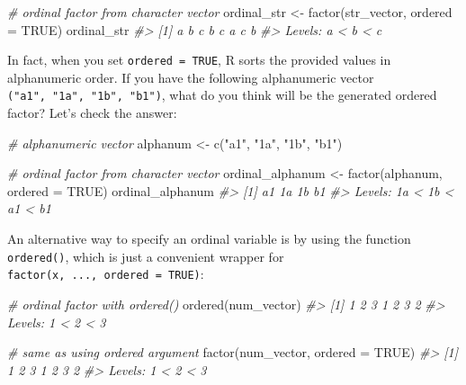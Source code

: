 \documentclass[
]{book}
\newenvironment{Shaded}{\begin{snugshade}}{\end{snugshade}}
\newcommand{\AttributeTok}[1]{\textcolor[rgb]{0.77,0.63,0.00}{#1}}
\newcommand{\CommentTok}[1]{\textcolor[rgb]{0.56,0.35,0.01}{\textit{#1}}}
\newcommand{\ConstantTok}[1]{\textcolor[rgb]{0.00,0.00,0.00}{#1}}
\newcommand{\FunctionTok}[1]{\textcolor[rgb]{0.00,0.00,0.00}{#1}}
\newcommand{\NormalTok}[1]{#1}
\newcommand{\OtherTok}[1]{\textcolor[rgb]{0.56,0.35,0.01}{#1}}
\newcommand{\StringTok}[1]{\textcolor[rgb]{0.31,0.60,0.02}{#1}}
\begin{document}
\begin{Shaded}
\begin{Highlighting}[]
\CommentTok{\# ordinal factor from character vector}
\NormalTok{ordinal\_str }\OtherTok{\textless{}{-}} \FunctionTok{factor}\NormalTok{(str\_vector, }\AttributeTok{ordered =} \ConstantTok{TRUE}\NormalTok{)}
\NormalTok{ordinal\_str}
\CommentTok{\#\textgreater{} [1] a b c b c a c b}
\CommentTok{\#\textgreater{} Levels: a \textless{} b \textless{} c}
\end{Highlighting}
\end{Shaded}

In fact, when you set \texttt{ordered\ =\ TRUE}, R sorts the provided values in
alphanumeric order. If you have the following alphanumeric vector
\texttt{("a1",\ "1a",\ "1b",\ "b1")}, what do you think will be the generated ordered
factor? Let's check the answer:

\begin{Shaded}
\begin{Highlighting}[]
\CommentTok{\# alphanumeric vector}
\NormalTok{alphanum }\OtherTok{\textless{}{-}} \FunctionTok{c}\NormalTok{(}\StringTok{"a1"}\NormalTok{, }\StringTok{"1a"}\NormalTok{, }\StringTok{"1b"}\NormalTok{, }\StringTok{"b1"}\NormalTok{)}

\CommentTok{\# ordinal factor from character vector}
\NormalTok{ordinal\_alphanum }\OtherTok{\textless{}{-}} \FunctionTok{factor}\NormalTok{(alphanum, }\AttributeTok{ordered =} \ConstantTok{TRUE}\NormalTok{)}
\NormalTok{ordinal\_alphanum}
\CommentTok{\#\textgreater{} [1] a1 1a 1b b1}
\CommentTok{\#\textgreater{} Levels: 1a \textless{} 1b \textless{} a1 \textless{} b1}
\end{Highlighting}
\end{Shaded}

An alternative way to specify an ordinal variable is by using the function
\texttt{ordered()}, which is just a convenient wrapper for
\texttt{factor(x,\ ...,\ ordered\ =\ TRUE)}:

\begin{Shaded}
\begin{Highlighting}[]
\CommentTok{\# ordinal factor with ordered()}
\FunctionTok{ordered}\NormalTok{(num\_vector)}
\CommentTok{\#\textgreater{} [1] 1 2 3 1 2 3 2}
\CommentTok{\#\textgreater{} Levels: 1 \textless{} 2 \textless{} 3}

\CommentTok{\# same as using \textquotesingle{}ordered\textquotesingle{} argument}
\FunctionTok{factor}\NormalTok{(num\_vector, }\AttributeTok{ordered =} \ConstantTok{TRUE}\NormalTok{)}
\CommentTok{\#\textgreater{} [1] 1 2 3 1 2 3 2}
\CommentTok{\#\textgreater{} Levels: 1 \textless{} 2 \textless{} 3}
\end{Highlighting}
\end{Shaded}
\end{document}
